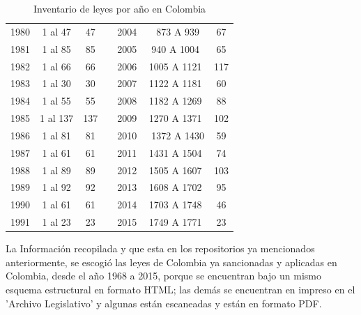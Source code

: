 \documentclass[conference]{IEEEtran}
\begin{document}
\begin{table}[h]
\begin{tabular}{|c|c|c|r|c|c|c|}
					1980 &    1 al 47 &         47 &            &       2004 &  873 A 939 &         67 \\
					
					1981 &    1 al 85 &         85 &            &       2005 & 940 A 1004 &         65 \\
					
					1982 &    1 al 66 &         66 &            &       2006 & 1005 A 1121 &        117 \\
					
					1983 &    1 al 30 &         30 &            &       2007 & 1122 A 1181 &         60 \\
					
					1984 &    1 al 55 &         55 &            &       2008 & 1182 A 1269 &         88 \\
					
					1985 &   1 al 137 &        137 &            &       2009 & 1270 A 1371 &        102 \\
					
					1986 &    1 al 81 &         81 &            &       2010 &  1372 A 1430 &         59 \\
					
					1987 &    1 al 61 &         61 &            &       2011 & 1431 A 1504 &         74 \\
					
					1988 &    1 al 89 &         89 &            &       2012 & 1505 A 1607 &        103 \\
					
					1989 &    1 al 92 &         92 &            &       2013 & 1608 A 1702 &         95 \\
					
					1990 &    1 al 61 &         61 &            &       2014 & 1703 A 1748 &         46 \\
					
					1991 &    1 al 23 &         23 &            &       2015 & 1749 A 1771 &         23 \\
					
				\end{tabular}  
				\caption{Inventario de leyes por año en Colombia}
				\label{inventario_leyes}
			\end{table}
	
	La Información recopilada y que esta en los repositorios ya mencionados anteriormente, se escogió las leyes de Colombia ya sancionadas y aplicadas en Colombia, desde el año 1968 a 2015, porque se encuentran bajo un mismo esquema estructural en formato HTML; las demás se encuentran en impreso en el 'Archivo Legislativo' y algunas están escaneadas y están en formato PDF.  
    
\end{document}
